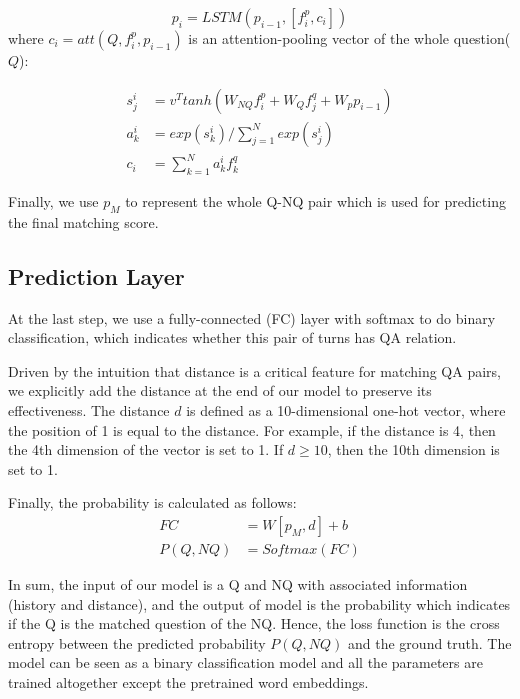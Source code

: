 \begin{equation}
    p_i=LSTM(p_{i-1},[f^p_i,c_i])
\end{equation}
where $c_i=att(Q,f^p_i,p_{i-1})$ is an attention-pooling vector of the whole question($Q$):

\begin{equation}
\begin{aligned}
s^i_j&=v^Ttanh(W_{NQ}f^p_i+W_Qf^q_j+W_pp_{i-1})\\
a^i_k&=exp(s^i_k)/\sum_{j=1}^Nexp(s^i_j)\\
c_i&=\sum_{k=1}^Na^i_kf^q_k
\end{aligned}
\end{equation}


Finally, we use $p_M$ to represent the whole Q-NQ pair which is used for predicting the final matching score.

\subsection{Prediction Layer }
At the last step, we use a fully-connected (FC) layer with softmax to do binary classification, which indicates whether this pair of turns has QA relation.

Driven by the intuition that distance is a critical feature 
for matching QA pairs, %
we explicitly add the distance at the end of our model to 
preserve its effectiveness. The distance $d$ is defined as 
a 10-dimensional one-hot vector, where the position of 
1 is equal to the distance. For example, if the distance is 4, then
the 4th dimension of the vector is set to 1. If $d\geq 10$, then the 10th
dimension is set to 1.

Finally, the probability is calculated as follows:
\begin{equation}
\begin{aligned}
FC&=W[p_M,d]+b\\
P(Q,NQ)&=Softmax(FC)
\end{aligned}
\end{equation}

In sum, the input of our model is a Q and NQ with associated information (history and distance), and the output of model is the probability which indicates if the Q is the matched question of the NQ. Hence, the loss function is the cross entropy between the predicted probability $P(Q,NQ)$ and the ground truth. The model can be seen as a binary classification model and all the parameters are trained altogether except the pretrained word embeddings.

